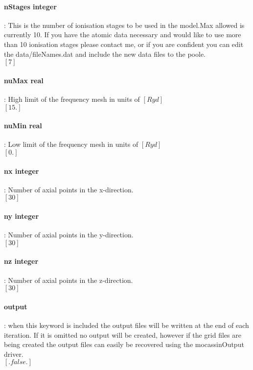 \documentclass[11pt]{article}
\begin{document}
\paragraph   { nStages integer}: This is the number of ionisation stages to be used in the model.Max allowed is currently 10. If you have the atomic data necessary and would like to use more than 10 ionisation stages please contact me, or if you are confident you can edit the data/fileNames.dat and include the new data files to the poole. \\
		     $[7]$ \\

\paragraph   { nuMax real  }    : High limit of the frequency mesh in units of $[Ryd]$\\
		     $[15.]$\\

\paragraph   { nuMin real }     : Low limit of the frequency mesh in units of $[Ryd]$\\
		     $[0.]$\\

\paragraph   { nx integer }     : Number of axial points in the x-direction.\\
		     $[30]$\\

\paragraph  {  ny integer}      : Number of axial points in the y-direction.\\
		     $[30]$\\

\paragraph  {  nz integer  }    : Number of axial points in the z-direction.\\
		     $[30]$\\

\paragraph  {  output  }        : when this keyword is included the output files will be written
                    at the end of each iteration. If it is omitted no output will be 
		    created, however if the grid files are being created the output 
                    files can easily be recovered using the mocassinOutput driver. \\
                    $[.false.]$\\
		    
\end{document}
